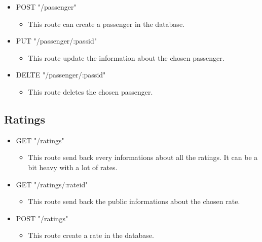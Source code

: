 \begin{itemize}
	\item POST "/passenger"
	\begin{itemize}
		\item 	This route can create a passenger in the database.
	\end{itemize}
\end{itemize}

\begin{itemize}
	\item PUT "/passenger/:passid"
	\begin{itemize}
		\item This route update the information about the chosen passenger.
	\end{itemize}
\end{itemize}

\begin{itemize}
	\item DELTE "/passenger/:passid"
	\begin{itemize}
		\item This route deletes the chosen passenger.
	\end{itemize}
\end{itemize}

\subsection{Ratings}
\begin{itemize}
	\item GET "/ratings"
	\begin{itemize}
		\item 	This route send back every informations about all the ratings. It can be a bit heavy with a lot of rates.
	\end{itemize}
\end{itemize}

\begin{itemize}
	\item GET "/ratings/:rateid"
	\begin{itemize}
		\item This route send back the public informations about the chosen rate.
	\end{itemize}
\end{itemize}

\begin{itemize}
	\item POST "/ratings"
	\begin{itemize}
		\item This route create a rate in the database.
	\end{itemize}
\end{itemize}

